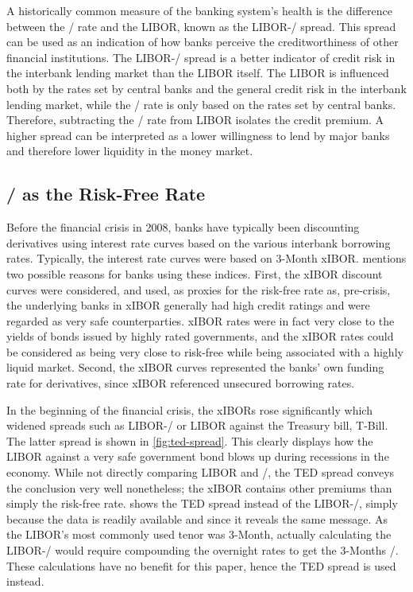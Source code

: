 \documentclass[main.tex]{subfiles}
\begin{document}
    A historically common measure of the banking system's health 
    is the difference between the \OIS/ rate and the LIBOR, known as the LIBOR-\OIS/ spread.
    This spread can be used as an indication of how banks perceive the creditworthiness
    of other financial institutions. 
    The LIBOR-\OIS/ spread is a better indicator of credit risk in the interbank lending market
    than the LIBOR itself. 
    The LIBOR is influenced both by the rates set by central banks and 
    the general credit risk in the interbank lending market,
    while the \OIS/ rate is only based on the rates set by central banks.
    Therefore, subtracting the \OIS/ rate from LIBOR isolates the credit premium.
    A higher spread can be interpreted as a lower willingness to lend by major banks
    and therefore lower liquidity in the money market.

    \subsection{\OIS/ as the Risk-Free Rate}
    
    Before the financial crisis in 2008, banks have typically been discounting
    derivatives using interest rate curves based on the various interbank borrowing rates.
    Typically, the interest rate curves were based on 3-Month xIBOR.
    \textcite[Section 8.6]{Green2015XVA} 
    mentions two possible reasons for banks using these indices.
    First, the xIBOR discount curves were considered, and used, as proxies for the risk-free rate
    as, pre-crisis, the underlying banks in xIBOR generally had high credit ratings
    and were regarded as very safe counterparties.
    xIBOR rates were in fact very close to the yields of bonds issued by highly rated governments,
    and the xIBOR rates could be considered as being very close to risk-free 
    while being associated with a highly liquid market.
    Second, the xIBOR curves represented the banks' own funding rate for derivatives, since
    xIBOR referenced unsecured borrowing rates.

    In the beginning of the financial crisis, the xIBORs rose significantly
    which widened spreads such as LIBOR-\OIS/ or LIBOR against the Treasury bill, T-Bill.
    The latter spread is shown in \cref{fig:ted-spread}. This clearly 
    displays how the LIBOR against a very safe government bond blows up
    during recessions in the economy. 
    While not directly comparing LIBOR and \OIS/, 
    the TED spread conveys the conclusion very well nonetheless;
    the xIBOR contains other premiums than simply the risk-free rate.
     shows the TED spread instead of the LIBOR-\OIS/,
    simply because the data is readily available and since it reveals the same message.
    As the LIBOR's most commonly used tenor was 3-Month, actually calculating the LIBOR-\OIS/
    would require compounding the overnight rates to get the 3-Months \OIS/.
    These calculations have no benefit for this paper, hence the TED spread is used instead.
\end{document}
